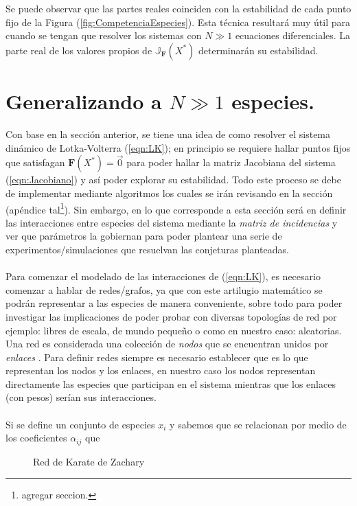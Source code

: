 Se puede observar que las partes reales coinciden con la estabilidad de cada punto fijo de la Figura (\ref{fig:CompetenciaEspecies}). Esta técnica resultará muy útil para cuando se tengan que resolver los sistemas con $N\gg 1$ ecuaciones diferenciales. La parte real de los valores propios de $\mathbb{J}_{\textbf{F}}(X^*)$ determinarán su estabilidad.
\section{Generalizando a $N\gg 1$ especies.}

Con base en la sección anterior, se tiene una idea de como resolver el sistema dinámico de Lotka-Volterra (\ref{eqn:LK}); en principio se requiere hallar puntos fijos que satisfagan $\textbf{F}(X^*)=\vec{0}$ para poder hallar la matriz Jacobiana del sistema (\ref{eqn:Jacobiano}) y así poder explorar su estabilidad. Todo este proceso se debe de implementar mediante algoritmos los cuales se irán revisando en la sección (apéndice tal\footnote{agregar seccion.}). Sin embargo, en lo que corresponde a esta sección será en definir las interacciones entre especies del sistema mediante la \textit{matriz de incidencias} y ver que parámetros la gobiernan para poder plantear una serie de experimentos/simulaciones que resuelvan las conjeturas planteadas.
\\
\\
Para comenzar el modelado de las interacciones de (\ref{eqn:LK}), es necesario comenzar a hablar de redes/grafos, ya que con este artilugio matemático se podrán representar a las especies de manera conveniente, sobre todo para poder investigar las implicaciones de poder probar con diversas topologías de red por ejemplo: libres de escala, de mundo pequeño o como en nuestro caso: aleatorias. Una red es considerada una colección de \textit{nodos} que se encuentran unidos por \textit{enlaces} \cite{newman2018networks}. Para definir redes siempre es necesario establecer que es lo que representan los nodos y los enlaces, en nuestro caso los nodos representan directamente las especies que participan en el sistema mientras que los enlaces (con pesos) serían sus interacciones.\\
\\
Si se define un conjunto de especies $x_i$ y sabemos que se relacionan por medio de los coeficientes $\alpha_{ij}$ que
\begin{figure} \vspace{-30pt} \begin{center}
		 
	\end{center} 
	\vspace{-20pt} 
	\caption{Red de Karate de Zachary} 
	\vspace{-20pt}
	\label{fig:RedKarate}
\end{figure} 
